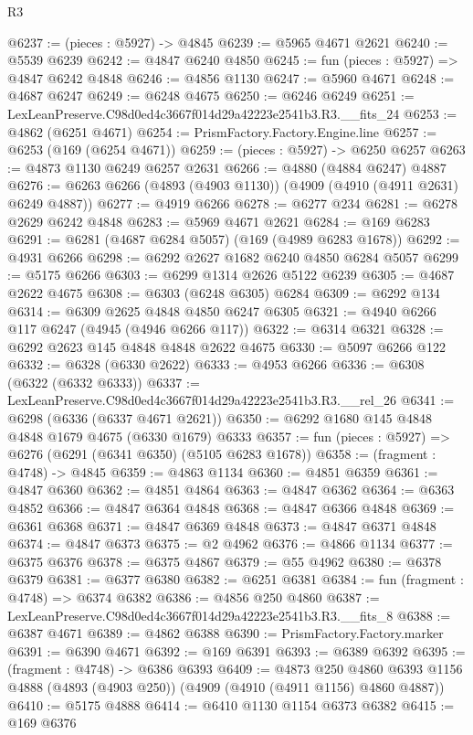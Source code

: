 \begin{lexlean}{R3}
\begin{coremodule}
@6237 := (pieces : @5927) -> @4845
@6239 := @5965 @4671 @2621
@6240 := @5539 @6239
@6242 := @4847 @6240 @4850
@6245 := fun (pieces : @5927) => @4847 @6242 @4848
@6246 := @4856 @1130
@6247 := @5960 @4671
@6248 := @4687 @6247
@6249 := @6248 @4675
@6250 := @6246 @6249
@6251 := LexLeanPreserve.C98d0ed4c3667f014d29a42223e2541b3.R3.__fits_24
@6253 := @4862 (@6251 @4671)
@6254 := PrismFactory.Factory.Engine.line
@6257 := @6253 (@169 (@6254 @4671))
@6259 := (pieces : @5927) -> @6250 @6257
@6263 := @4873 @1130 @6249 @6257 @2631
@6266 := @4880 (@4884 @6247) @4887
@6276 := @6263 @6266 (@4893 (@4903 @1130)) (@4909 (@4910 (@4911 @2631) @6249 @4887))
@6277 := @4919 @6266
@6278 := @6277 @234
@6281 := @6278 @2629 @6242 @4848
@6283 := @5969 @4671 @2621
@6284 := @169 @6283
@6291 := @6281 (@4687 @6284 @5057) (@169 (@4989 @6283 @1678))
@6292 := @4931 @6266
@6298 := @6292 @2627 @1682 @6240 @4850 @6284 @5057
@6299 := @5175 @6266
@6303 := @6299 @1314 @2626 @5122 @6239
@6305 := @4687 @2622 @4675
@6308 := @6303 (@6248 @6305) @6284
@6309 := @6292 @134
@6314 := @6309 @2625 @4848 @4850 @6247 @6305
@6321 := @4940 @6266 @117 @6247 (@4945 (@4946 @6266 @117))
@6322 := @6314 @6321
@6328 := @6292 @2623 @145 @4848 @4848 @2622 @4675
@6330 := @5097 @6266 @122
@6332 := @6328 (@6330 @2622)
@6333 := @4953 @6266
@6336 := @6308 (@6322 (@6332 @6333))
@6337 := LexLeanPreserve.C98d0ed4c3667f014d29a42223e2541b3.R3.__rel_26
@6341 := @6298 (@6336 (@6337 @4671 @2621))
@6350 := @6292 @1680 @145 @4848 @4848 @1679 @4675 (@6330 @1679) @6333
@6357 := fun (pieces : @5927) => @6276 (@6291 (@6341 @6350) (@5105 @6283 @1678))
@6358 := (fragment : @4748) -> @4845
@6359 := @4863 @1134
@6360 := @4851 @6359
@6361 := @4847 @6360
@6362 := @4851 @4864
@6363 := @4847 @6362
@6364 := @6363 @4852
@6366 := @4847 @6364 @4848
@6368 := @4847 @6366 @4848
@6369 := @6361 @6368
@6371 := @4847 @6369 @4848
@6373 := @4847 @6371 @4848
@6374 := @4847 @6373
@6375 := @2 @4962
@6376 := @4866 @1134
@6377 := @6375 @6376
@6378 := @6375 @4867
@6379 := @55 @4962
@6380 := @6378 @6379
@6381 := @6377 @6380
@6382 := @6251 @6381
@6384 := fun (fragment : @4748) => @6374 @6382
@6386 := @4856 @250 @4860
@6387 := LexLeanPreserve.C98d0ed4c3667f014d29a42223e2541b3.R3.__fits_8
@6388 := @6387 @4671
@6389 := @4862 @6388
@6390 := PrismFactory.Factory.marker
@6391 := @6390 @4671
@6392 := @169 @6391
@6393 := @6389 @6392
@6395 := (fragment : @4748) -> @6386 @6393
@6409 := @4873
    @250
    @4860
    @6393
    @1156
    @4888
    (@4893 (@4903 @250))
    (@4909 (@4910 (@4911 @1156) @4860 @4887))
@6410 := @5175 @4888
@6414 := @6410 @1130 @1154 @6373 @6382
@6415 := @169 @6376

\end{coremodule}
\end{lexlean}
